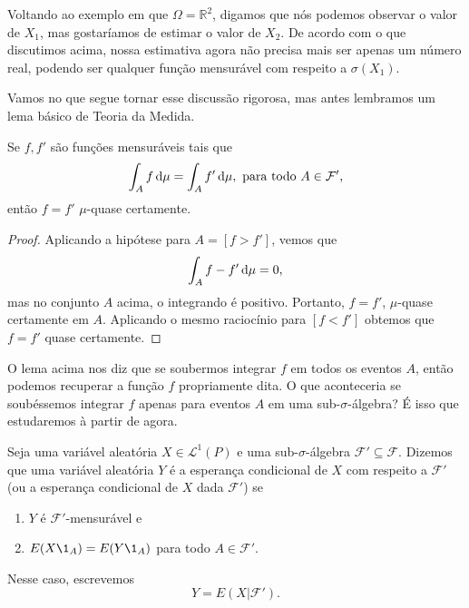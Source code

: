 Voltando ao exemplo em que $\Omega = \mathbb{R}^2$, digamos que nós podemos observar o valor de $X_1$, mas gostaríamos de estimar o valor de $X_2$.
De acordo com o que discutimos acima, nossa estimativa agora não precisa mais ser apenas um número real, podendo ser qualquer função mensurável com respeito a $\sigma(X_1)$.

Vamos no que segue tornar esse discussão rigorosa, mas antes lembramos um lema básico de Teoria da Medida.

\begin{lemma}
  \label{l:f_igual_fp}
  Se $f, f'$ são funções mensuráveis tais que
  \begin{equation}
    \int_A f \mathop{}\!\mathrm{d} \mu = \int_A f' \mathop{}\!\mathrm{d} \mu, \text{ para todo $A \in \mathcal{F}'$,}
  \end{equation}
  então $f = f'$ $\mu$-quase certamente.
\end{lemma}

\begin{proof}
  Aplicando a hipótese para $A = [f > f']$, vemos que
  \begin{equation}
    \int_A f - f' \mathop{}\!\mathrm{d} \mu = 0,
  \end{equation}
  mas no conjunto $A$ acima, o integrando é positivo.
  Portanto, $f = f'$, $\mu$-quase certamente em $A$.
  Aplicando o mesmo raciocínio para $[f < f']$ obtemos que $f = f'$ quase certamente.
\end{proof}

O lema acima nos diz que se soubermos integrar $f$ em todos os eventos $A$, então podemos recuperar a função $f$ propriamente dita.
O que aconteceria se soubéssemos integrar $f$ apenas para eventos $A$ em uma sub-$\sigma$-álgebra?
É isso que estudaremos à partir de agora.

\begin{definition}
  \label{d:esperanca_condicional}
  Seja uma variável aleatória $X \in \mathcal{L}^1(P)$ e uma sub-$\sigma$-álgebra $\mathcal{F}' \subseteq \mathcal{F}$.
  Dizemos que uma variável aleatória $Y$ é a esperança condicional  de $X$ com respeito a $\mathcal{F}'$ (ou a esperança condicional de $X$ dada $\mathcal{F}'$) se
  \begin{enumerate}[\quad a)]
  \item $Y$ é $\mathcal{F}'$-mensurável e
  \item $E(X \1_{A}) = E(Y \1_{A})$ para todo $A \in \mathcal{F}'$.
  \end{enumerate}
  Nesse caso, escrevemos
  \begin{equation}
    Y = E(X | \mathcal{F}').
  \end{equation}
\end{definition}

